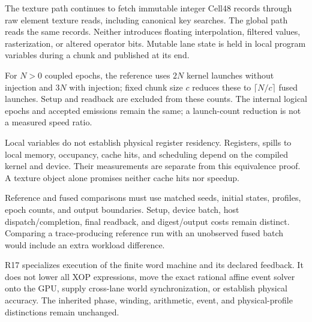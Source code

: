 The texture path continues to fetch immutable integer Cell48 records
through raw element texture reads, including canonical key searches.
The global path reads the same records. Neither introduces floating
interpolation, filtered values, rasterization, or altered operator bits.
Mutable lane state is held in local program variables during a chunk
and published at its end.

For $N>0$ coupled epochs, the reference uses $2N$ kernel launches
without injection and $3N$ with injection; fixed chunk size $c$ reduces
these to $\lceil N/c\rceil$ fused launches. Setup and readback are
excluded from these counts. The internal logical epochs and accepted
emissions remain the same; a launch-count reduction is not a measured
speed ratio.

Local variables do not establish physical register residency. Registers,
spills to local memory, occupancy, cache hits, and scheduling depend on
the compiled kernel and device. Their measurements are separate from
this equivalence proof. A texture object alone promises neither cache
hits nor speedup.

Reference and fused comparisons must use matched seeds, initial states,
profiles, epoch counts, and output boundaries. Setup, device batch,
host dispatch/completion, final readback, and digest/output costs remain
distinct. Comparing a trace-producing reference run with an unobserved
fused batch would include an extra workload difference.

R17 specializes execution of the finite word machine and its declared
feedback. It does not lower all XOP expressions, move the exact rational
affine event solver onto the GPU, supply cross-lane world synchronization,
or establish physical accuracy. The inherited phase, winding, arithmetic,
event, and physical-profile distinctions remain unchanged.
